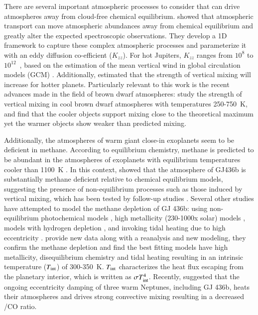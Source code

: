 There are several important atmospheric processes to consider that can drive atmospheres away from cloud-free chemical equilibrium. \citet{Zhang2018a} showed that atmospheric transport can move atmospheric abundances away from chemical equilibrium and greatly alter the expected spectroscopic observations. They develop a 1D framework to capture these complex atmospheric processes and parameterize it with an eddy diffusion co-efficient ($K_{zz}$). For hot Jupiters, $K_{zz}$ ranges from $10^8$ to $10^{12}$~\cmcms, based on the estimation of the mean vertical wind in global circulation models (GCM) \citep{Moses2011, Parmentier2013}. Additionally, \citet{Komacek2019} estimated that the strength of vertical mixing will increase for hotter planets. Particularly relevant to this work is the recent advances made in the field of brown dwarf atmospheres: \citet{Miles2020} study the strength of vertical mixing in cool brown dwarf atmospheres with temperatures 250-750~K, and find that the cooler objects support mixing close to the theoretical maximum yet the warmer objects show weaker than predicted mixing.


Additionally, the atmospheres of warm giant close-in exoplanets seem to be deficient in methane. According to equilibrium chemistry, methane is predicted to be abundant in the atmospheres of exoplanets with equilibrium temperatures cooler than 1100~K \citep{Madhusudhan2012}. In this context, \citep{Stevenson2010a} showed that the atmosphere of GJ436b is substantially methane deficient relative to chemical equilibrium models, suggesting the presence of non-equilibrium processes such as those induced by vertical mixing, which has been tested by follow-up studies \citep{Knutson2011, Lanotte2014}. Several other studies have attempted to model the methane depletion of GJ 436b: using non-equilibrium photochemical models \citep{Line2011}, high metallicity (230-1000x solar) models \citep{Moses2013b}, models with hydrogen depletion \citep{Hu2015}, and invoking tidal heating due to high eccentricity \citep{Agundez2014}. \citet{Morley2017} provide new data along with a reanalysis and new modeling, they confirm the methane depletion and find the best fitting models have high metallicity, disequilibrium chemistry and tidal heating resulting in an intrinsic temperature ($T_{\rm int}$) of 300-350~K. $T_{\rm int}$ characterizes the heat flux escaping from the planetary interior, which is written as $\sigma T_{\rm int}^4$. Recently, \citet{Fortney2020} suggested that the ongoing eccentricity damping of three warm Neptunes, including GJ 436b, heats their atmospheres and drives strong convective mixing resulting in a decreased /CO ratio.

